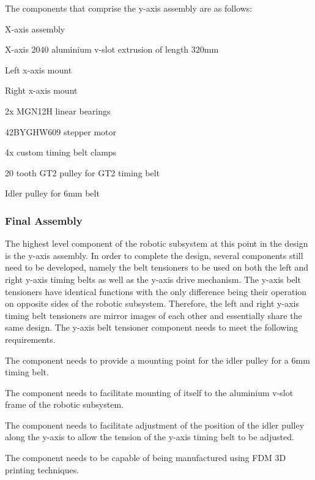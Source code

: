 The components that comprise the y-axis assembly are as follows:

\begin{compactitem}
	\item X-axis assembly
	\item X-axis 2040 aluminium v-slot extrusion of length 320mm
	\item Left x-axis mount
	\item Right x-axis mount
	\item 2x MGN12H linear bearings
	\item 42BYGHW609 stepper motor
	\item 4x custom timing belt clamps
	\item 20 tooth GT2 pulley for GT2 timing belt
	\item Idler pulley for 6mm belt
\end{compactitem}

\subsubsection{Final Assembly}

The highest level component of the robotic subsystem at this point in the design is the y-axis assembly. In order to complete the design, several components still need to be developed, namely the belt tensioners to be used on both the left and right y-axis timing belts as well as the y-axis drive mechanism. The y-axis belt tensioners have identical functions with the only difference being their operation on opposite sides of the robotic subsystem. Therefore, the left and right y-axis timing belt tensioners are mirror images of each other and essentially share the same design. The y-axis belt tensioner component needs to meet the following requirements.

\begin{compactitem}
	\item The component needs to provide a mounting point for the idler pulley for a 6mm timing belt.
	\item The component needs to facilitate mounting of itself to the aluminium v-slot frame of the robotic subsystem.
	\item The component needs to facilitate adjustment of the position of the idler pulley along the y-axis to allow the tension of the y-axis timing belt to be adjusted.
	\item The component needs to be capable of being manufactured using FDM 3D printing techniques.
\end{compactitem}

